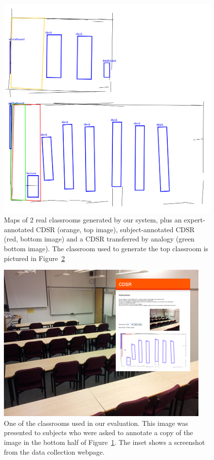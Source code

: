 \documentclass[letterpaper]{article}
\begin{document}
\begin{figure}
  \includegraphics[width=\columnwidth]{images/worked-example-rooms.png}
  \caption{Maps of 2 real classrooms generated by our system, plus an expert-annotated CDSR (orange, top image), subject-annotated CDSR (red, bottom image) and a CDSR transferred by analogy (green bottom image). The classroom used to generate the top classroom is pictured in Figure~\ref{fig:ug40}}
  \label{fig:rooms}
\end{figure}

\begin{figure}
  \includegraphics[width=\columnwidth]{images/ug40.png}
  \caption{One of the classrooms used in our evaluation. This image was presented to subjects who were asked to annotate a copy of the image in the bottom half of Figure~\ref{fig:rooms}. The inset shows a screenshot from the data collection webpage.}
  \label{fig:ug40}
\end{figure}
\end{document}
